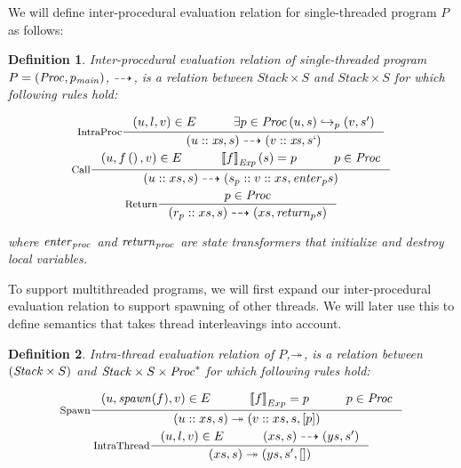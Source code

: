 \documentclass[..thesis.tex]{subfiles}
\newtheorem{defin}{Definition}[section]
\begin{document}
We will define inter-procedural evaluation relation for single-threaded program $P$ as follows:

\begin{defin}

Inter-procedural evaluation relation of single-threaded program $P = \left( \mathit{Proc},p_{\mathit{main}} \right) $, 
$\dashrightarrow$, is a relation between $Stack \times S$ and $Stack \times S$ for which following rules hold:

\addtolength{\jot}{2em}
\begin{gather*}
  \inference[IntraProc]{\lp u, l, v \rp \in E  \separ \exists p \in \mathword{Proc}  \lp u, s \rp \intraproc_p \lp v, s' \rp }{ \lp u :: \mathword{xs}, s \rp \interproc \lp v :: \mathword{xs}, s` \rp} \\
  \inference[Call]{ \lp u, f\lp\rp , v \rp  \in E \separ  \lllb f \rrrb_{\mathword{Exp}} \lp s \rp = p \separ p \in \mathword{Proc} }{\lp u :: xs , s \rp \interproc \lp s_{p} :: v :: xs, \mathword{enter}_{p} s \rp} \\
  \inference[Return] { p \in \mathword{Proc}} { \lp r_{p}::xs , s \rp \interproc \lp xs, \mathword{return}_{p} s \rp}
\end{gather*}
\addtolength{\jot}{-2em}

where $\mathit{enter}_{\mathit{proc}}$ and $\mathit{return}_{\mathit{proc}}$ are state transformers that initialize and destroy local variables.
\end{defin}


To support multithreaded programs, we will first expand our inter-procedural evaluation relation to support spawning of other threads.
We will later use this to define semantics that takes thread interleavings into account.

\begin{defin}

  Intra-thread evaluation relation of $P$,$\twoheadrightarrow$,
  is a relation between $\left( \mathit{Stack} \times S \right)$ and $\mathit{Stack} \times S \times \mathit{Proc}^\ast$ for which following rules hold:

  \addtolength{\jot}{2em}
  \begin{gather*}
    \inference[Spawn]{\lp u, \mathword{spawn}(f), v \rp \in E  \separ  \lllb f \rrrb_{Exp} = p \separ p \in \mathword{Proc}}{ \lp u :: xs, s \rp \intrathread \lp v :: xs, s, \lbk p \rbk \rp} \\
    \inference[IntraThread] {\lp u, l , v \rp \in E \separ \lp xs , s \rp \interproc \lp ys, s' \rp }{ \lp xs , s \rp \intrathread \lp ys, s', \lbk \rbk \rp}
  \end{gather*}
  \addtolength{\jot}{-2em}

\end{defin}
\end{document}

